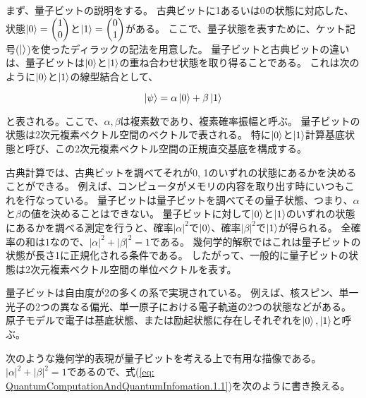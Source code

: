 
まず、量子ビットの説明をする。
古典ビットに1あるいは0の状態に対応した、
状態$\ket{0} = \begin{pmatrix}
    1 \\
    0
\end{pmatrix}$と$\ket{1} = \begin{pmatrix}
    0 \\
    1
\end{pmatrix}$がある。
ここで、量子状態を表すために、ケット記号($\ket{}$)を使ったディラックの記法を用意した。
量子ビットと古典ビットの違いは、量子ビットは$\ket{0}$と$\ket{1}$の重ね合わせ状態を取り得ることである。
これは次のように$\ket{0}$と$\ket{1}$の線型結合として、

\begin{equation}
    \label{eq: QuantumComputationAndQuantumInfomation.1.1}
    \ket{\psi} = \alpha \ket{0} + \beta \ket{1}
\end{equation}

と表される。ここで、$\alpha, \beta$は複素数であり、複素確率振幅と呼ぶ。
量子ビットの状態は2次元複素ベクトル空間のベクトルで表される。
特に$\ket{0}$と$\ket{1}$計算基底状態と呼び、この2次元複素ベクトル空間の正規直交基底を構成する。

古典計算では、古典ビットを調べてそれが0, 1のいずれの状態にあるかを決めることができる。
例えば、コンピュータがメモリの内容を取り出す時にいつもこれを行なっている。
量子ビットは量子ビットを調べてその量子状態、つまり、$\alpha$と$\beta$の値を決めることはできない。
量子ビットに対して$\ket{0}$と$\ket{1}$のいずれの状態にあるかを調べる測定を行うと、確率$|\alpha|^2$で$\ket{0}$、確率$|\beta|^2$で$\ket{1}$が得られる。
全確率の和は$1$なので、$|\alpha|^2 + |\beta|^2 = 1$である。
幾何学的解釈ではこれは量子ビットの状態が長さ1に正規化される条件である。
したがって、一般的に量子ビットの状態は2次元複素ベクトル空間の単位ベクトルを表す。

量子ビットは自由度が2の多くの系で実現されている。
例えば、核スピン、単一光子の2つの異なる偏光、単一原子における電子軌道の2つの状態などがある。
原子モデルで電子は基底状態、または励起状態に存在しそれぞれを$\ket{0}, \ket{1}$と呼ぶ。

次のような幾何学的表現が量子ビットを考える上で有用な描像である。
$|\alpha|^2 + |\beta|^2 = 1$であるので、式(\ref{eq: QuantumComputationAndQuantumInfomation.1.1})を次のように書き換える。


